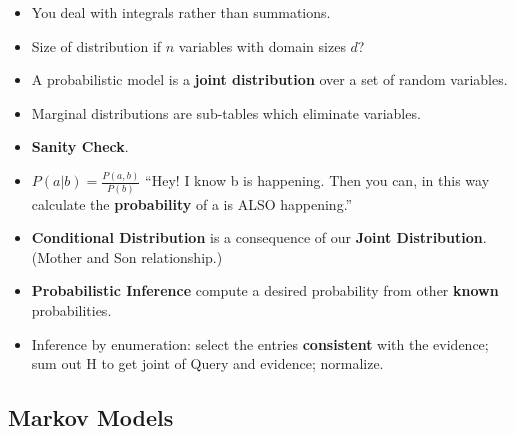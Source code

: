 \documentclass[twocolumn]{article}
\begin{document}
\begin{itemize}
\item You deal with integrals rather than summations. 
\item Size of distribution if $n$ variables with domain sizes $d$?
\item A probabilistic model is a \textbf{joint distribution} over a
  set of random variables.
\item Marginal distributions are sub-tables which eliminate
  variables. 
\item \textbf{Sanity Check}.
\item $P(a|b)=\frac{P(a,b)}{P(b)}$ ``Hey! I know b is happening. Then
  you can, in this way calculate the \textbf{probability} of a is ALSO
  happening.''
\item \textbf{Conditional Distribution} is a consequence of our
  \textbf{Joint Distribution}. (Mother and Son relationship.)
\item \textbf{Probabilistic Inference} compute a desired probability
  from other \textbf{known} probabilities.
\item Inference by enumeration: select the entries \textbf{consistent} with the
  evidence; sum out H to get joint of Query and evidence; normalize.
\end{itemize}

\subsection{Markov Models}
\label{sec:markov-models}
\end{document}
